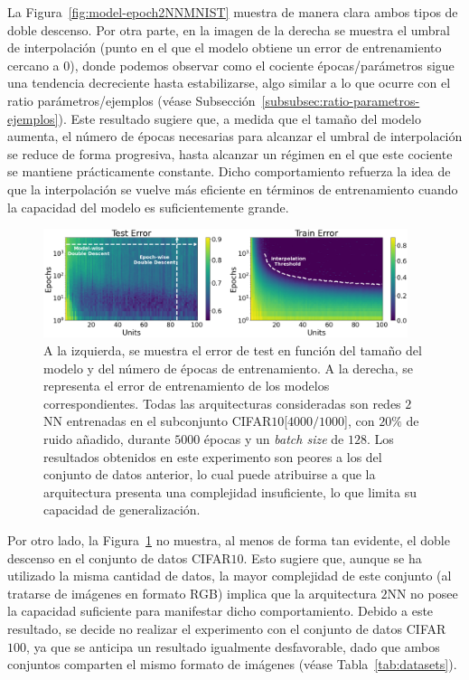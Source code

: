 La Figura~\ref{fig:model-epoch2NNMNIST} muestra de manera clara ambos tipos de doble descenso. Por otra parte, en la imagen de la derecha se muestra el umbral de interpolación (punto en el que el modelo obtiene un error de entrenamiento cercano a $0$), donde podemos observar como el cociente épocas/parámetros sigue una tendencia decreciente hasta estabilizarse, algo similar a lo que ocurre con el ratio parámetros/ejemplos (véase Subsección~\ref{subsubsec:ratio-parametros-ejemplos}). Este resultado sugiere que, a medida que el tamaño del modelo aumenta, el número de épocas necesarias para alcanzar el umbral de interpolación se reduce de forma progresiva, hasta alcanzar un régimen en el que este cociente se mantiene prácticamente constante. Dicho comportamiento refuerza la idea de que la interpolación se vuelve más eficiente en términos de entrenamiento cuando la capacidad del modelo es suficientemente grande.

\begin{figure}[h]
    \centering
    \includegraphics[width=0.95\textwidth]{img/experiments/model-epoch2NNCIFAR10.png}
    \caption[Error en entrenamiento y test en función del tamaño del modelo y del número de épocas para la red $2$NN y un subconjunto de CIFAR$10$.]{A la izquierda, se muestra el error de test en función del tamaño del modelo y del número de épocas de entrenamiento. A la derecha, se representa el error de entrenamiento de los modelos correspondientes. Todas las arquitecturas consideradas son redes $2$NN entrenadas en el subconjunto CIFAR$10$[$4000/1000$], con $20\%$ de ruido añadido, durante $5000$ épocas y un \textit{batch size} de $128$. Los resultados obtenidos en este experimento son peores a los del conjunto de datos anterior, lo cual puede atribuirse a que la arquitectura presenta una complejidad insuficiente, lo que limita su capacidad de generalización.}\label{fig:model-epoch2NNCIFAR10}
\end{figure}

Por otro lado, la Figura~\ref{fig:model-epoch2NNCIFAR10} no muestra, al menos de forma tan evidente, el doble descenso en el conjunto de datos CIFAR$10$. Esto sugiere que, aunque se ha utilizado la misma cantidad de datos, la mayor complejidad de este conjunto (al tratarse de imágenes en formato RGB) implica que la arquitectura $2$NN no posee la capacidad suficiente para manifestar dicho comportamiento. Debido a este resultado, se decide no realizar el experimento con el conjunto de datos CIFAR$100$, ya que se anticipa un resultado igualmente desfavorable, dado que ambos conjuntos comparten el mismo formato de imágenes (véase Tabla~\ref{tab:datasets}).

